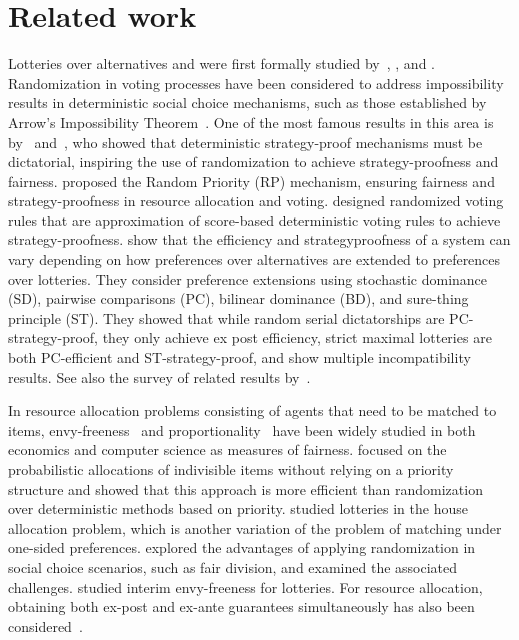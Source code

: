 \section{Related work}
Lotteries over alternatives and were first formally studied by~\citet{zeckhauser1969majority}, \citet{fishburn1972lotteries}, and \citet{intriligator1973probabilistic}.
Randomization in voting processes have been considered to address impossibility results in deterministic social choice mechanisms, such as those established by Arrow’s Impossibility Theorem~\citep{arrow1951}. One of the most famous results in this area is by~\citet{Gib73} and~\citet{Sat75}, who showed that deterministic strategy-proof mechanisms must be dictatorial, inspiring the use of randomization to achieve strategy-proofness and fairness. \citet{bogomolnaia2001} 
proposed the Random Priority (RP) mechanism, ensuring fairness and strategy-proofness in resource allocation and voting.
\citet{procaccia2010} designed randomized voting rules that are approximation of score-based deterministic voting rules to achieve strategy-proofness. 
\citet{a18} show that the efficiency and strategyproofness of a system can vary depending on how preferences over alternatives are extended to preferences over lotteries. They consider preference extensions using stochastic dominance (SD),  pairwise comparisons (PC), bilinear dominance (BD), and sure-thing principle (ST). They showed that while random serial dictatorships are PC-strategy-proof, they only achieve ex post efficiency, strict maximal lotteries are both PC-efficient and ST-strategy-proof, and show multiple incompatibility results. See also the survey of related results by~\citet{B17}.

In resource allocation problems consisting of agents that need to be matched to items, envy-freeness~\citep{foley1966resource,varian1973equity} and proportionality~\citep{steinhaus1948problem} have been widely studied in both economics and computer science as measures of fairness.  
\citet{hylland1979efficient} focused on the probabilistic allocations of indivisible items without relying on a priority structure and showed that this approach is more efficient than randomization over deterministic methods based on priority. \citet{abdulkadirouglu2003ordinal} studied lotteries in the house allocation problem, which is another variation of the problem of matching under one-sided preferences.
\citet{aziz2019probabilistic} explored the advantages of applying randomization in social choice scenarios, such as fair division, and examined the associated challenges. \citet{caragiannis2021interim} studied interim envy-freeness for lotteries. For resource allocation, obtaining both ex-post and ex-ante guarantees simultaneously has also been considered~\citep{babaioff2022best,aziz2024best}.  


